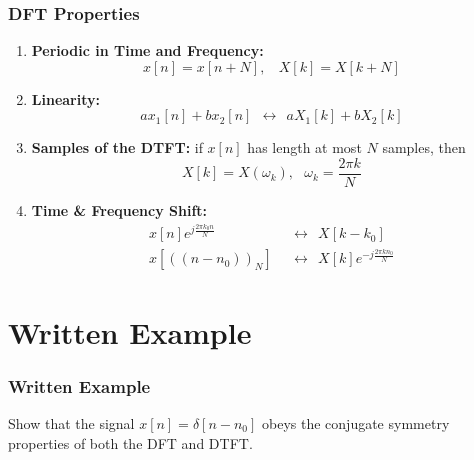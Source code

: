 \documentclass{beamer}
\begin{document}
\begin{frame}
  \frametitle{DFT Properties}

  \begin{enumerate}
  \item {\bf Periodic in Time and Frequency:}
    \begin{displaymath}
      x[n]=x[n+N],~~~~X[k]=X[k+N]
    \end{displaymath}
  \item {\bf Linearity:}
    \begin{displaymath}
      ax_1[n]+bx_2[n]~~\leftrightarrow~~aX_1[k]+bX_2[k]
    \end{displaymath}
  \item {\bf Samples of the DTFT:} if $x[n]$ has length at most $N$ samples, then
    \begin{displaymath}
      X[k] = X(\omega_k),~~~\omega_k=\frac{2\pi k}{N}
    \end{displaymath}
  \item {\bf Time \& Frequency Shift:}
    \begin{align*}
      x[n]e^{j\frac{2\pi k_0 n}{N}} ~~&\leftrightarrow~~X[k-k_0]\\
      x\left[((n-n_0))_N\right] ~~&\leftrightarrow~~X[k]e^{-j\frac{2\pi kn_0}{N}}
    \end{align*}
  \end{enumerate}
\end{frame}

\section[Written]{Written Example}
\setcounter{subsection}{1}


\begin{frame}
  \frametitle{Written  Example}

  Show that the signal $x[n]=\delta[n-n_0]$ obeys the conjugate
  symmetry properties of both the DFT and DTFT.
\end{frame}
\end{document}
